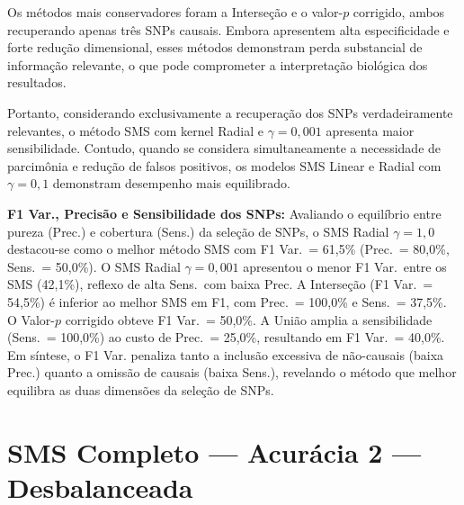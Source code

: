 \documentclass[
    12pt,
    a4paper,
    oneside,
    english,
    french,
    spanish,
    brazil
    ]{abntex2}
\newcommand{\novo}[1]{\textcolor{corNova}{#1}}
\begin{document}
Os métodos mais conservadores foram a Interseção e o valor-$p$ corrigido, ambos recuperando apenas três SNPs causais. Embora apresentem alta especificidade e forte redução dimensional, esses métodos demonstram perda substancial de informação relevante, o que pode comprometer a interpretação biológica dos resultados.

Portanto, considerando exclusivamente a recuperação dos SNPs verdadeiramente relevantes, o método SMS com kernel Radial e $\gamma = 0{,}001$ apresenta maior sensibilidade. Contudo, quando se considera simultaneamente a necessidade de parcimônia e redução de falsos positivos, os modelos SMS Linear e Radial com $\gamma = 0{,}1$ demonstram desempenho mais equilibrado.


\novo{\textbf{F1 Var., Precisão e Sensibilidade dos SNPs:} Avaliando o equilíbrio entre pureza (Prec.) e cobertura (Sens.) da seleção de SNPs, o SMS Radial $\gamma=1{,}0$ destacou-se como o melhor método SMS com F1 Var.\ = 61,5\% (Prec.\ = 80,0\%, Sens.\ = 50,0\%). O SMS Radial $\gamma=0{,}001$ apresentou o menor F1 Var.\ entre os SMS (42,1\%), reflexo de alta Sens.\ com baixa Prec. A Interseção (F1 Var.\ = 54,5\%) é inferior ao melhor SMS em F1, com Prec.\ = 100,0\% e Sens.\ = 37,5\%. O Valor-$p$ corrigido obteve F1 Var.\ = 50,0\%. A União amplia a sensibilidade (Sens.\ = 100,0\%) ao custo de Prec.\ = 25,0\%, resultando em F1 Var.\ = 40,0\%. Em síntese, o F1 Var. penaliza tanto a inclusão excessiva de não-causais (baixa Prec.) quanto a omissão de causais (baixa Sens.), revelando o método que melhor equilibra as duas dimensões da seleção de SNPs.}
\section{SMS Completo --- Acurácia 2 --- Desbalanceada}
\end{document}
